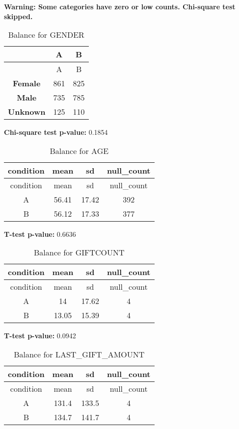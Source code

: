 \documentclass[
]{article}
\begin{document}
\textbf{Warning: Some categories have zero or low counts. Chi-square
test skipped.} \pagebreak

\begin{longtable}[]{@{}ccc@{}}
\caption{Balance for GENDER}\tabularnewline
\toprule\noalign{}
~ & A & B \\
\midrule\noalign{}
\endfirsthead
\toprule\noalign{}
~ & A & B \\
\midrule\noalign{}
\endhead
\bottomrule\noalign{}
\endlastfoot
\textbf{Female} & 861 & 825 \\
\textbf{Male} & 735 & 785 \\
\textbf{Unknown} & 125 & 110 \\
\end{longtable}

\textbf{Chi-square test p-value:} 0.1854\\
\pagebreak

\begin{longtable}[]{@{}cccc@{}}
\caption{Balance for AGE}\tabularnewline
\toprule\noalign{}
condition & mean & sd & null\_count \\
\midrule\noalign{}
\endfirsthead
\toprule\noalign{}
condition & mean & sd & null\_count \\
\midrule\noalign{}
\endhead
\bottomrule\noalign{}
\endlastfoot
A & 56.41 & 17.42 & 392 \\
B & 56.12 & 17.33 & 377 \\
\end{longtable}

\textbf{T-test p-value:} 0.6636\\
\pagebreak

\begin{longtable}[]{@{}cccc@{}}
\caption{Balance for GIFTCOUNT}\tabularnewline
\toprule\noalign{}
condition & mean & sd & null\_count \\
\midrule\noalign{}
\endfirsthead
\toprule\noalign{}
condition & mean & sd & null\_count \\
\midrule\noalign{}
\endhead
\bottomrule\noalign{}
\endlastfoot
A & 14 & 17.62 & 4 \\
B & 13.05 & 15.39 & 4 \\
\end{longtable}

\textbf{T-test p-value:} 0.0942\\
\pagebreak

\begin{longtable}[]{@{}cccc@{}}
\caption{Balance for LAST\_GIFT\_AMOUNT}\tabularnewline
\toprule\noalign{}
condition & mean & sd & null\_count \\
\midrule\noalign{}
\endfirsthead
\toprule\noalign{}
condition & mean & sd & null\_count \\
\midrule\noalign{}
\endhead
\bottomrule\noalign{}
\endlastfoot
A & 131.4 & 133.5 & 4 \\
B & 134.7 & 141.7 & 4 \\
\end{longtable}
\end{document}
